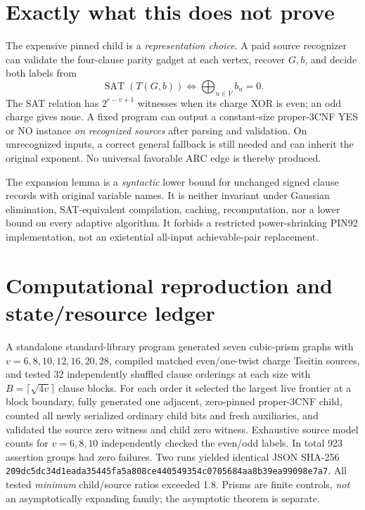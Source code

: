 \documentclass[11pt]{article}
\newcommand{\SAT}{\operatorname{SAT}}
\begin{document}
\section{Exactly what this does not prove}
The expensive pinned child is a \emph{representation choice}. A paid source recognizer can validate the four-clause parity gadget at each vertex, recover $G,b$, and decide both labels from
\[
\SAT(T(G,b))\iff\bigoplus_{u\in V}b_u=0.
\]
The SAT relation has $2^{e-v+1}$ witnesses when its charge XOR is even; an odd charge gives none. A fixed program can output a constant-size proper-3CNF YES or NO instance \emph{on recognized sources} after parsing and validation. On unrecognized inputs, a correct general fallback is still needed and can inherit the original exponent. No universal favorable ARC edge is thereby produced.

The expansion lemma is a \emph{syntactic} lower bound for unchanged signed clause records with original variable names. It is neither invariant under Gaussian elimination, SAT-equivalent compilation, caching, recomputation, nor a lower bound on every adaptive algorithm. It forbids a restricted power-shrinking PIN92 implementation, not an existential all-input achievable-pair replacement.

\section{Computational reproduction and state/resource ledger}
A standalone standard-library program generated seven cubic-prism graphs with $v=6,8,10,12,16,20,28$, compiled matched even/one-twist charge Tseitin sources, and tested 32 independently shuffled clause orderings at each size with $B=\lceil\sqrt{4v}\rceil$ clause blocks. For each order it selected the largest live frontier at a block boundary, fully generated one adjacent, zero-pinned proper-3CNF child, counted all newly serialized ordinary child bits and fresh auxiliaries, and validated the source zero witness and child zero witness. Exhaustive source model counts for $v=6,8,10$ independently checked the even/odd labels. In total 923 assertion groups had zero failures. Two runs yielded identical JSON SHA-256 \texttt{209dc5dc34d1eada35445fa5a808ce440549354c0705684aa8b39ea99098e7a7}. All tested \emph{minimum} child/source ratios exceeded 1.8. Prisms are finite controls, \emph{not} an asymptotically expanding family; the asymptotic theorem is separate.
\end{document}
